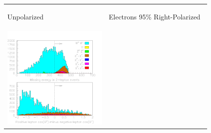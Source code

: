 \documentclass[12pt]{article}
\begin{document}
\begin{figure}[t]
  \begin{center}
    \begin{tabular}{p{0.49\linewidth} p{0.49\linewidth}}
      \begin{center} Unpolarized \end{center} &
      \begin{center} Electrons 95\% Right-Polarized \end{center} \\
      \begin{minipage}{\linewidth} \vspace{-1.2 cm} \includegraphics[width=\linewidth]{../pretty_plots/two_leptons_1_fixed.pdf} \end{minipage} &

\end{tabular}
\end{center}
\end{figure}
\end{document}
